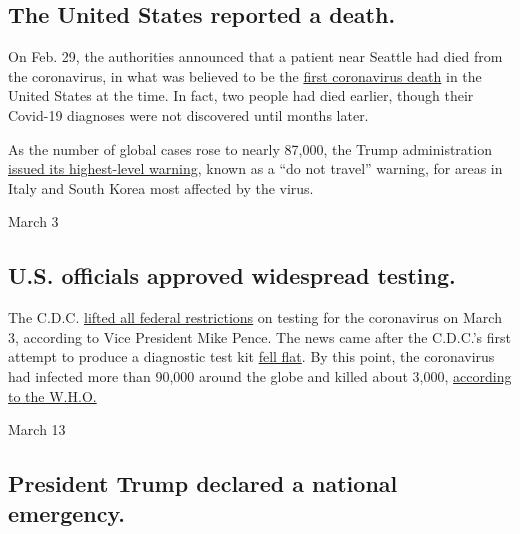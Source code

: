 \hypertarget{the-united-states-reported-a-death}{%
\subsection{The United States reported a
death.}\label{the-united-states-reported-a-death}}

On Feb. 29, the authorities announced that a patient near Seattle had
died from the coronavirus, in what was believed to be the
\href{https://www.nytimes3xbfgragh.onion/2020/02/29/us/coronavirus-washington-death.html?action=click\&module=RelatedLinks\&pgtype=Article}{first
coronavirus death} in the United States at the time. In fact, two people
had died earlier, though their Covid-19 diagnoses were not discovered
until months later.

As the number of global cases rose to nearly 87,000, the Trump
administration
\href{https://www.nytimes3xbfgragh.onion/2020/02/29/world/coronavirus-news.html\#link-63f783d3}{issued
its highest-level warning}, known as a ``do not travel'' warning, for
areas in Italy and South Korea most affected by the virus.

March 3

\hypertarget{us-officials-approved-widespread-testing}{%
\subsection{U.S. officials approved widespread
testing.}\label{us-officials-approved-widespread-testing}}

The C.D.C.
\href{https://www.nytimes3xbfgragh.onion/2020/03/03/world/coronavirus-live-news-updates.html\#link-79b1dbc8}{lifted
all federal restrictions} on testing for the coronavirus on March 3,
according to Vice President Mike Pence. The news came after the C.D.C.'s
first attempt to produce a diagnostic test kit
\href{https://www.nytimes3xbfgragh.onion/2020/03/02/world/coronavirus-updates-news-covid-19.html}{fell
flat}. By this point, the coronavirus had infected more than 90,000
around the globe and killed about 3,000,
\href{https://www.who.int/docs/default-source/coronaviruse/situation-reports/20200303-sitrep-43-covid-19.pdf?sfvrsn=2c21c09c_2}{according
to the W.H.O.}

March 13

\hypertarget{president-trump-declared-a-national-emergency}{%
\subsection{President Trump declared a national
emergency.}\label{president-trump-declared-a-national-emergency}}

